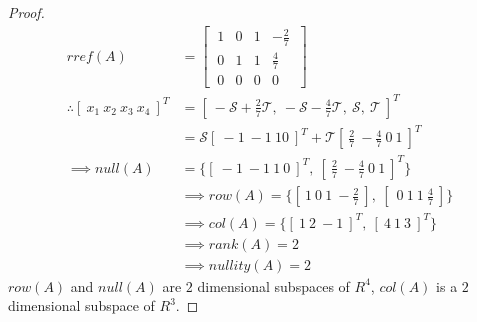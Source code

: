 \documentclass[../main.tex]{subfiles}
\begin{document}
\begin{proof}
        \begin{align*}
                rref(A)                                  & =
                \begin{bmatrix}
                        \ 1 & 0 & 1 & -\frac{2}{7} \ \\
                        \ 0 & 1 & 1 & \frac{4}{7} \  \\
                        \ 0 & 0 & 0 & 0 \
                \end{bmatrix}                                                                                                                                      \\
                \therefore [\ x_1 \ x_2 \ x_3 \ x_4\ ]^T & = [\ -\mathcal{S}+\frac{2}{7}\mathcal{T}, \ -\mathcal{S} -\frac{4}{7}\mathcal{T}, \ \mathcal{S}, \ \mathcal{T}\ ]^T \\
                                                         & = \mathcal{S}[\ -1 \ -1 \ 1 0\ ]^T + \mathcal{T}[\ \frac{2}{7}\ -\frac{4}{7}\ 0\ 1\ ]^T                             \\
                \implies null(A)                         & = \{[\ -1 \ -1 \ 1\ 0\ ]^T,\  [\ \frac{2}{7} \ -\frac{4}{7} \ 0 \ 1\ ]^T\}                                          \\
                                                         & \implies row(A) = \{[\ 1 \ 0 \ 1 \ -\frac{2}{7}\ ],\ [\ \ 0 \ 1 \ 1 \ \frac{4}{7}\ ]\}                              \\
                                                         & \implies col(A) = \{[\ 1 \ 2 \ -1\ ]^T,\ [\ 4 \ 1 \ 3\ ]^T\}                                                        \\
                                                         & \implies rank(A) = 2                                                                                                \\
                                                         & \implies nullity(A) = 2
        \end{align*}
        $row(A)$ and $null(A)$ are $2$ dimensional subspaces of $R^4$, $col(A)$ is a $2$ dimensional subspace of $R^3$.
\end{proof}
\pagebreak
\end{document}
